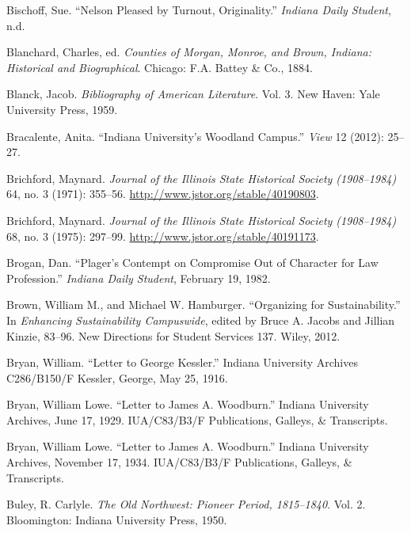 \documentclass[
  american,
  letterpaper,
]{scrreprt}
\newlength{\cslhangindent}
\newenvironment{CSLReferences}[2] %
 {\begin{list}{}{%
  \setlength{\itemindent}{0pt}
  \setlength{\leftmargin}{0pt}
  \setlength{\parsep}{0pt}
  \ifodd #1
   \setlength{\leftmargin}{\cslhangindent}
   \setlength{\itemindent}{-1\cslhangindent}
  \fi
  \setlength{\itemsep}{#2\baselineskip}}}
 {\end{list}}
\begin{document}
\begin{CSLReferences}{1}{0}
Bischoff, Sue. {``Nelson Pleased by Turnout, Originality.''}
\emph{Indiana Daily Student}, n.d.

Blanchard, Charles, ed. \emph{Counties of Morgan, Monroe, and Brown,
Indiana: Historical and Biographical}. Chicago: F.A. Battey \& Co.,
1884.

Blanck, Jacob. \emph{Bibliography of American Literature}. Vol. 3. New
Haven: Yale University Press, 1959.

Bracalente, Anita. {``Indiana University's Woodland Campus.''}
\emph{View} 12 (2012): 25--27.

Brichford, Maynard. \emph{Journal of the Illinois State Historical
Society (1908--1984)} 64, no. 3 (1971): 355--56.
\url{http://www.jstor.org/stable/40190803}.

Brichford, Maynard. \emph{Journal of the Illinois State Historical
Society (1908--1984)} 68, no. 3 (1975): 297--99.
\url{http://www.jstor.org/stable/40191173}.

Brogan, Dan. {``Plager's Contempt on Compromise Out of Character for Law
Profession.''} \emph{Indiana Daily Student}, February 19, 1982.

Brown, William M., and Michael W. Hamburger. {``Organizing for
Sustainability.''} In \emph{Enhancing Sustainability Campuswide}, edited
by Bruce A. Jacobs and Jillian Kinzie, 83--96. New Directions for
Student Services 137. Wiley, 2012.

Bryan, William. {``Letter to George Kessler.''} Indiana University
Archives C286/B150/F Kessler, George, May 25, 1916.

Bryan, William Lowe. {``Letter to James {A.} Woodburn.''} Indiana
University Archives, June 17, 1929. IUA/C83/B3/F Publications, Galleys,
\& Transcripts.

Bryan, William Lowe. {``Letter to James {A.} Woodburn.''} Indiana
University Archives, November 17, 1934. IUA/C83/B3/F Publications,
Galleys, \& Transcripts.

Buley, R. Carlyle. \emph{The Old Northwest: Pioneer Period, 1815--1840}.
Vol. 2. Bloomington: Indiana University Press, 1950.


\end{CSLReferences}
\end{document}
